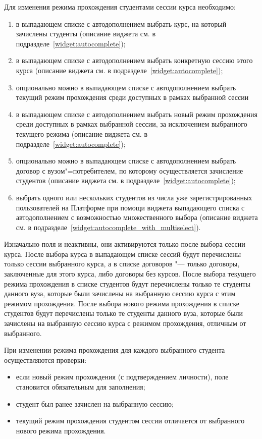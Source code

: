 Для изменения режима прохождения студентами сессии курса необходимо:
\begin{enumerate}
	\item в выпадающем списке с автодополнением выбрать курс, на который зачислены студенты 
	(описание виджета см. в подразделе~\ref{widget:autocomplete});
	\item в выпадающем списке с автодополнением выбрать конкретную сессию этого курса 
	(описание виджета см. в подразделе~\ref{widget:autocomplete});
	\item опционально можно в выпадающем списке с автодополнением выбрать текущий режим прохождения среди 
	доступных в рамках выбранной сессии
	\item в выпадающем списке с автодополнением выбрать новый режим прохождения среди доступных в рамках выбранной 
	сессии, за исключением выбранного текущего режима (описание виджета см. в подразделе~\ref{widget:autocomplete});
	\item опционально можно в выпадающем списке с автодополнением выбрать договор с вузом"=потребителем, 
	по которому осуществляется зачисление студентов (описание виджета см. в подразделе~\ref{widget:autocomplete});
	\item выбрать одного или нескольких студентов из числа уже зарегистрированных пользователей на Платформе при помощи 
	виджета выпадающего списка с автодополнением с возможностью множественного выбора 
	(описание виджета см. в подразделе~\ref{widget:autocomplete_with_multiselect}). 
\end{enumerate}

Изначально поля  и  неактивны, они активируются только после выбора сессии курса.
После выбора курса в выпадающем списке сессий будут перечислены только сессии выбранного курса, 
а в списке договоров "--- только договоры, заключенные для этого курса, либо договоры без курсов.
После выбора текущего режима прохождения в списке студентов будут перечислены только те студенты данного вуза, 
которые были зачислены на выбранную сессию курса с этим режимом прохождения.
После выбора нового режима прохождения в списке студентов будут перечислены только те студенты данного вуза, 
которые были зачислены на выбранную сессию курса с режимом прохождения, отличным от выбранного.

При изменении режима прохождения для каждого выбранного студента осуществляются проверки:
\begin{itemize}
	\item если новый режим прохождения  (с подтверждением личности), поле  
	становится обязательным для заполнения; 
	\item студент был ранее зачислен на выбранную сессию;
	\item текущий режим прохождения студентом сессии отличается от выбранного нового режима прохождения.
\end{itemize}

